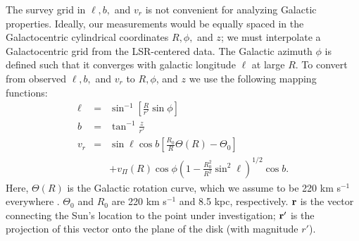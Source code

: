 \documentclass[apj]{emulateapj}
\begin{document}
The survey grid in $\ell,b,$ and $v_r$ is not convenient for analyzing Galactic properties. Ideally, our measurements would be equally spaced in the Galactocentric cylindrical coordinates $R,\phi,$ and $z$; we must interpolate a Galactocentric grid from the LSR-centered data. The Galactic azimuth $\phi$ is defined such that it converges with galactic longitude $\ell$ at large $R$. To convert from observed $\ell,b,$ and $v_r$ to $R,\phi$, and $z$ we use the following mapping functions:
\begin{eqnarray}\label{eqn:transform}
\ell&=&\sin^{-1}\left[\frac{R}{r'}\sin\phi\right]\nonumber\\
b&=&\tan^{-1}\frac{z}{r'}\nonumber\\
v_r&=&\sin\ell\cos b\left[\frac{R_0}{R}\Theta(R)-\Theta_0\right]\nonumber\\
&&+v_\Pi(R)\cos\phi\left(1-\frac{R_0^2}{R^2}\sin^2\ell\right)^{1/2}\cos b.
\end{eqnarray}
Here, $\Theta(R)$ is the Galactic rotation curve, which we assume to be 220  km s$^{-1}$ everywhere \citep{BB1993}. $\Theta_0$ and $R_0$ are 220 km s$^{-1}$ and 8.5 kpc, respectively. $\bf{r}$ is the vector connecting the Sun's location to the point under investigation; $\bf{r'}$ is the projection of this vector onto the plane of the disk (with magnitude $r'$).
\end{document}
